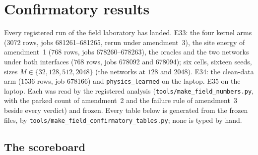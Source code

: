 \documentclass[10pt,a4paper]{article}
\newcommand{\code}[1]{\texttt{\small #1}}
\theoremstyle{plain}
\theoremstyle{remark}
\begin{document}
\section{Confirmatory results}\label{sec:conf}

{\sloppy Every registered run of the field laboratory has landed. E33: the four kernel arms ($3072$ rows, jobs
681261--681265, rerun under amendment~3), the site energy of amendment~1 ($768$ rows, jobs
678260--678263), the oracles and the two networks under both interfaces ($768$ rows, jobs 678092 and
678094); six cells, sixteen seeds, sizes $M\in\{32,128,512,2048\}$ (the networks at $128$ and $2048$).
E34: the clean-data arm ($1536$ rows, job 678166) and \code{physics\_learned} on the laptop. E35 on the
laptop. Each was read by the registered analysis (\code{tools/make\_field\_numbers.py}, with the parked count
of amendment~2 and the failure rule of amendment~3 beside every verdict) and frozen. Every table below is
generated from the frozen files, by \code{tools/make\_field\_confirmatory\_tables.py}; none is typed by hand.\par}

\subsection{The scoreboard}

\begin{table}[h]\centering\footnotesize
\caption{E33, score risk over the linear floor (the covariance twin, E33's oracles), mean over sixteen seeds,
through one noised view per sequence. Below one beats the Gaussian closure. Kernel arms by EM through grid
BP, parameter counts in brackets; networks under the two interfaces. A superscript counts failed fits
(amendment~3), excluded from the mean; ``failed'': all sixteen.}
\label{tab:conf-score}

\end{table}
\end{document}
